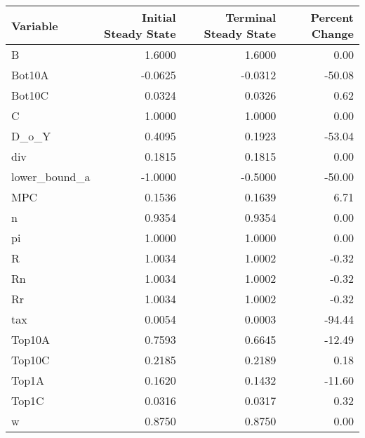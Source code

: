 \begin{table}
\centering
\label{tab:stst}
\begin{tabular}{lrrr}
\toprule
      Variable &  Initial Steady State &  Terminal Steady State &  Percent Change \\
\midrule
             B &                1.6000 &                 1.6000 &            0.00 \\
        Bot10A &               -0.0625 &                -0.0312 &          -50.08 \\
        Bot10C &                0.0324 &                 0.0326 &            0.62 \\
             C &                1.0000 &                 1.0000 &            0.00 \\
         D\_o\_Y &                0.4095 &                 0.1923 &          -53.04 \\
           div &                0.1815 &                 0.1815 &            0.00 \\
 lower\_bound\_a &               -1.0000 &                -0.5000 &          -50.00 \\
           MPC &                0.1536 &                 0.1639 &            6.71 \\
             n &                0.9354 &                 0.9354 &            0.00 \\
            pi &                1.0000 &                 1.0000 &            0.00 \\
             R &                1.0034 &                 1.0002 &           -0.32 \\
            Rn &                1.0034 &                 1.0002 &           -0.32 \\
            Rr &                1.0034 &                 1.0002 &           -0.32 \\
           tax &                0.0054 &                 0.0003 &          -94.44 \\
        Top10A &                0.7593 &                 0.6645 &          -12.49 \\
        Top10C &                0.2185 &                 0.2189 &            0.18 \\
         Top1A &                0.1620 &                 0.1432 &          -11.60 \\
         Top1C &                0.0316 &                 0.0317 &            0.32 \\
             w &                0.8750 &                 0.8750 &            0.00 \\

\end{tabular}
\end{table}
